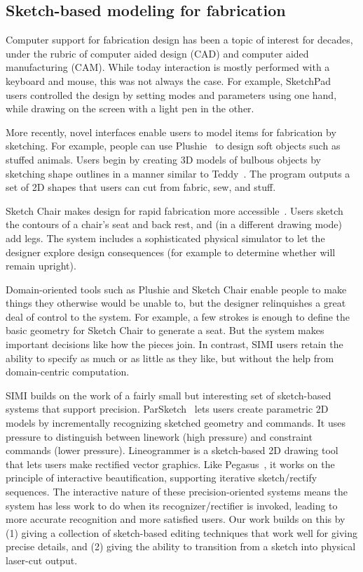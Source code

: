 \documentclass{article}
\begin{document}
\subsection{Sketch-based modeling for fabrication}

Computer support for fabrication design has been a topic of interest
for decades, under the rubric of computer aided design (CAD) and
computer aided manufacturing (CAM). While today interaction is mostly
performed with a keyboard and mouse, this was not always the case. For
example, SketchPad~\cite{sutherland-sketchpad} users controlled the
design by setting modes and parameters using one hand, while drawing
on the screen with a light pen in the other.

More recently, novel interfaces enable users to model items for
fabrication by sketching. For example, people can use
Plushie~\cite{mori-plushie} to design soft objects such as stuffed
animals. Users begin by creating 3D models of bulbous objects by
sketching shape outlines in a manner similar to
Teddy~\cite{igarashi-teddy}. The program outputs a set of 2D shapes
that users can cut from fabric, sew, and stuff.

Sketch Chair makes design for rapid fabrication more
accessible~\cite{saul-sketch-chair}. Users sketch the contours of a
chair's seat and back rest, and (in a different drawing mode) add
legs. The system includes a sophisticated physical simulator to let
the designer explore design consequences (for example to determine
whether will remain upright).

Domain-oriented tools such as Plushie and Sketch Chair enable people
to make things they otherwise would be unable to, but the designer
relinquishes a great deal of control to the system. For example, a few
strokes is enough to define the basic geometry for Sketch Chair to
generate a seat. But the system makes important decisions like how the
pieces join. In contrast, SIMI users retain the ability to specify as
much or as little as they like, but without the help from
domain-centric computation.

SIMI builds on the work of a fairly small but interesting set of
sketch-based systems that support precision.
ParSketch~\cite{naya-parsketch} lets users create parametric 2D models
by incrementally recognizing sketched geometry and commands. It uses
pressure to distinguish between linework (high pressure) and
constraint commands (lower
pressure). Lineogrammer\cite{zeleznik-lineogrammer} is a sketch-based
2D drawing tool that lets users make rectified vector graphics. Like
Pegasus~\cite{igarashi-pegasus}, it works on the principle of
interactive beautification, supporting iterative sketch/rectify
sequences. The interactive nature of these precision-oriented systems
means the system has less work to do when its recognizer/rectifier is
invoked, leading to more accurate recognition and more satisfied
users. Our work builds on this by (1) giving a collection of
sketch-based editing techniques that work well for giving precise
details, and (2) giving the ability to transition from a sketch into
physical laser-cut output.
\end{document}
